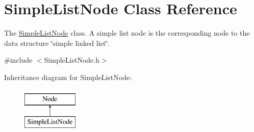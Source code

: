\hypertarget{class_simple_list_node}{\section{Simple\-List\-Node Class Reference}
\label{class_simple_list_node}
}


The \hyperlink{class_simple_list_node}{Simple\-List\-Node} class. A simple list node is the corresponding node to the data structure \char`\"{}simple linked list\char`\"{}.  




{\ttfamily \#include $<$Simple\-List\-Node.\-h$>$}

Inheritance diagram for Simple\-List\-Node\-:\begin{figure}[H]
\begin{center}
\leavevmode
\includegraphics[height=2.000000cm]{class_simple_list_node}
\end{center}
\end{figure}
